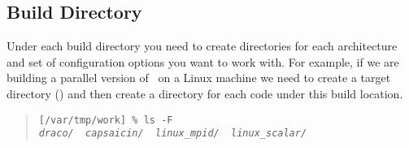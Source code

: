 %
%
%
%
%
%

\subsection{Build Directory}
\label{builddir}

Under each build directory you need to create directories for each
architecture and set of configuration options you want to work with.
For example, if we are building a parallel version of \draco\ on a
Linux machine we need to create a target directory ()
and then create a directory for each code under this build location.

\footnotesize
\begin{verse}
\texttt{[/var/tmp/work] \% ls -F \\
\emph{draco/\ \ capsaicin/\ \ linux\_mpid/\ \ linux\_scalar/ }}
\end{verse}

